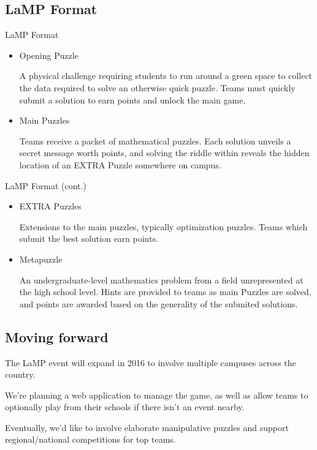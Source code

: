 \documentclass{beamer}
\theoremstyle{theorem}
\theoremstyle{definition}
\newcommand{\<}{\langle}
\renewcommand{\>}{\rangle}
\newcommand{\vpause}{\pause\vspace{1em}}
\begin{document}
\subsection{LaMP Format}

\begin{frame}{LaMP Format}

  \begin{itemize}
    \item
    Opening Puzzle

    A physical challenge requiring students to run around a green space
    to collect the data required to solve an otherwise quick puzzle.
    Teams must quickly submit a solution to earn points and
    unlock the main game.

    \pause

    \item
    Main Puzzles

    Teams receive a packet of mathematical puzzles. Each solution unveils
    a secret message worth points, and solving the riddle within reveals
    the hidden location of an EXTRA Puzzle somewhere on campus.

  \end{itemize}
\end{frame}

\begin{frame}{LaMP Format (cont.)}

  \begin{itemize}
    \item
    EXTRA Puzzles

    Extensions to the main puzzles, typically optimization puzzles.
    Teams which submit the best solution earn points.

    \pause

    \item
    Metapuzzle

    An undergraduate-level mathematics problem from a field
    unrepresented at the high school level. Hints are provided to teams
    as main Puzzles are solved, and points are awarded based on the
    generality of the submited solutions.
  \end{itemize}
\end{frame}

\subsection{Moving forward}

\begin{frame}
  The LaMP event will expand in 2016 to involve multiple campuses
  across the country.

  \vpause

  We're planning a web application to manage the game, as well
  as allow teams to optionally play
  from their schools if there isn't an event nearby.

  \vpause

  Eventually, we'd like to involve elaborate manipulative puzzles
  and support regional/national competitions for top teams.
\end{frame}
\end{document}
